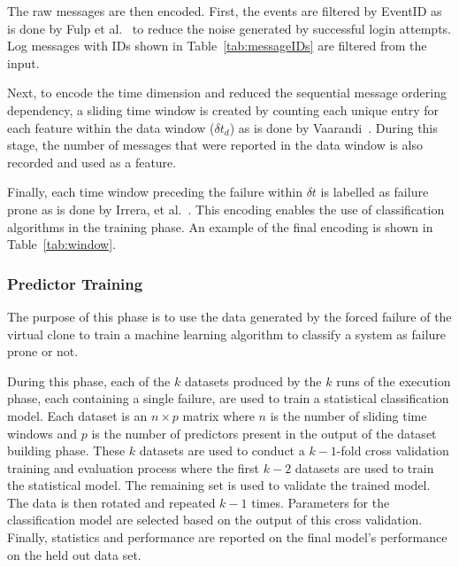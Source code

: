 \tabMessage

The raw messages are then encoded.  First, the events are filtered by EventID
as is done by Fulp et al.~\cite{fulp2008} to reduce the noise generated by
successful login attempts.  Log messages with IDs shown in
Table~\ref{tab:messageIDs} are filtered from the input.  

Next, to encode the time dimension and reduced the sequential message ordering
dependency, a sliding time window is created by counting each unique entry for
each feature within the data window ($\delta t_d$) as is done by
Vaarandi~\cite{vaarandi2002}.  During this stage, the number of messages that
were reported in the data window is also recorded and used as a feature.

Finally, each time window preceding the failure within $\delta t$ is labelled
as failure prone as is done by Irrera, et al.~\cite{irrera2015}.  This encoding
enables the use of classification algorithms in the training phase.  An example
of the final encoding is shown in Table~\ref{tab:window}.

\tabMessageIDs %
\tabSlidingWindow

\subsubsection{Predictor Training}
The purpose of this phase is to use the data generated by the forced failure of
the virtual clone to train a machine learning algorithm to classify a system as
failure prone or not.  

During this phase, each of the $k$ datasets produced by the $k$ runs of the
execution phase, each containing a single failure, are used to train a
statistical classification model.  Each dataset is an $n \times p$ matrix where
$n$ is the number of sliding time windows and $p$ is the number of predictors
present in the output of the dataset building phase.  These $k$ datasets are
used to conduct a $k - 1$-fold cross validation training and evaluation process
where the first $k - 2$ datasets are used to train the statistical model.  The
remaining set is used to validate the trained model.  The data is then rotated
and repeated $k - 1$ times.  Parameters for the classification model are
selected based on the output of this cross validation.  Finally, statistics and
performance are reported on the final model's performance on the held out data
set.

